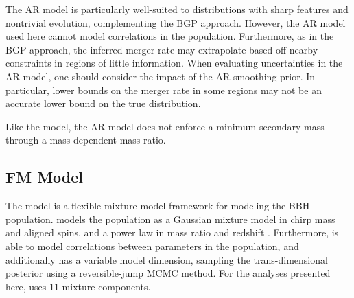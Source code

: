 The \ac{AR} model is particularly well-suited to distributions with sharp features and nontrivial evolution, complementing the \ac{BGP} approach. 
However, the \ac{AR} model used here cannot model correlations in the population. Furthermore, as in the \ac{BGP} approach, the inferred merger rate may extrapolate based off nearby constraints in regions of little information.
When evaluating uncertainties in the \ac{AR} model, one should consider the impact of the \ac{AR} smoothing prior. 
In particular, lower bounds on the merger rate in some regions may not be an accurate lower bound on the true distribution.

Like the \BSpline model, the \ac{AR} model does not enforce a minimum secondary mass through a mass-dependent mass ratio.

\subsection{\acf{FM} Model}

The \vamana model \citep{Tiwari:2020vym} is a flexible mixture model framework for modeling the \ac{BBH} population. 
\vamana models the population as a Gaussian mixture model in chirp mass and aligned spins, and a power law in mass ratio and redshift \citep{Tiwari:2021yvr}. 
Furthermore, \vamana is able to model correlations between parameters in the population, and additionally has a variable model dimension, sampling the trans-dimensional posterior using a reversible-jump MCMC method. For the analyses presented here, \vamana uses $11$ mixture components.
